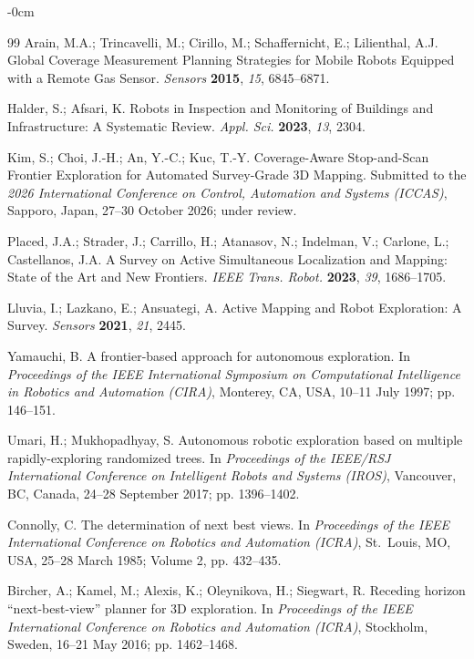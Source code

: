\documentclass[sensors,article,submit,pdftex,moreauthors]{Definitions/mdpi}
\begin{document}
\begin{adjustwidth}{-\extralength}{0cm}
\begin{thebibliography}{99}
Arain, M.A.; Trincavelli, M.; Cirillo, M.; Schaffernicht, E.; Lilienthal, A.J. Global Coverage Measurement Planning Strategies for Mobile Robots Equipped with a Remote Gas Sensor. \textit{Sensors} \textbf{2015}, \textit{15}, 6845--6871.

Halder, S.; Afsari, K. Robots in Inspection and Monitoring of Buildings and Infrastructure: A Systematic Review. \textit{Appl. Sci.} \textbf{2023}, \textit{13}, 2304.

Kim, S.; Choi, J.-H.; An, Y.-C.; Kuc, T.-Y. Coverage-Aware Stop-and-Scan Frontier Exploration for Automated Survey-Grade 3D Mapping. Submitted to the \textit{2026 International Conference on Control, Automation and Systems (ICCAS)}, Sapporo, Japan, 27--30 October 2026; under review.

Placed, J.A.; Strader, J.; Carrillo, H.; Atanasov, N.; Indelman, V.; Carlone, L.; Castellanos, J.A. A Survey on Active Simultaneous Localization and Mapping: State of the Art and New Frontiers. \textit{IEEE Trans. Robot.} \textbf{2023}, \textit{39}, 1686--1705.

Lluvia, I.; Lazkano, E.; Ansuategi, A. Active Mapping and Robot Exploration: A Survey. \textit{Sensors} \textbf{2021}, \textit{21}, 2445.

Yamauchi, B. A frontier-based approach for autonomous exploration. In \textit{Proceedings of the IEEE International Symposium on Computational Intelligence in Robotics and Automation (CIRA)}, Monterey, CA, USA, 10--11 July 1997; pp. 146--151.

Umari, H.; Mukhopadhyay, S. Autonomous robotic exploration based on multiple rapidly-exploring randomized trees. In \textit{Proceedings of the IEEE/RSJ International Conference on Intelligent Robots and Systems (IROS)}, Vancouver, BC, Canada, 24--28 September 2017; pp. 1396--1402.

Connolly, C. The determination of next best views. In \textit{Proceedings of the IEEE International Conference on Robotics and Automation (ICRA)}, St.\ Louis, MO, USA, 25--28 March 1985; Volume 2, pp. 432--435.

Bircher, A.; Kamel, M.; Alexis, K.; Oleynikova, H.; Siegwart, R. Receding horizon ``next-best-view'' planner for 3D exploration. In \textit{Proceedings of the IEEE International Conference on Robotics and Automation (ICRA)}, Stockholm, Sweden, 16--21 May 2016; pp. 1462--1468.


\end{thebibliography}
\end{adjustwidth}
\end{document}

